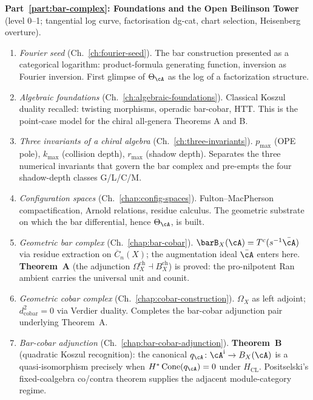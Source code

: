 \textbf{Part~\ref{part:bar-complex}: Foundations and the Open Beilinson Tower} (level 0--1; tangential log curve, factorisation dg-cat, chart selection, Heisenberg overture).
\begin{enumerate}[label=\textup{\arabic*.}]
\item \emph{Fourier seed} (Ch.~\ref{ch:fourier-seed}).
 The bar construction presented as a categorical logarithm:
 product-formula generating function, inversion as Fourier
 inversion. First glimpse of $\Theta_\cA$ as the log of a
 factorization structure.

\item \emph{Algebraic foundations}
 (Ch.~\ref{ch:algebraic-foundations}).
 Classical Koszul duality recalled: twisting morphisms, operadic
 bar-cobar, HTT. This is the point-case model for the chiral
 all-genera Theorems A and B.

\item \emph{Three invariants of a chiral algebra}
 (Ch.~\ref{ch:three-invariants}).
 $p_{\max}$ (OPE pole), $k_{\max}$ (collision depth), $r_{\max}$
 (shadow depth). Separates the three numerical invariants that
 govern the bar complex and pre-empts the four shadow-depth classes G/L/C/M.

\item \emph{Configuration spaces}
 (Ch.~\ref{chap:config-spaces}).
 Fulton--MacPherson compactification, Arnold relations, residue
 calculus. The geometric substrate on which the bar differential,
 hence $\Theta_\cA$, is built.

\item \emph{Geometric bar complex}
 (Ch.~\ref{chap:bar-cobar}).
 $\barB_X(\cA) = T^c(s^{-1}\bar\cA)$ via residue extraction on
 $\overline{C}_n(X)$; the augmentation ideal $\bar\cA$ enters here.
 \textbf{Theorem~A} (the adjunction
 $\Omega_X^{\mathrm{ch}}\dashv B_X^{\mathrm{ch}}$) is proved:
 the pro-nilpotent Ran ambient carries the universal unit and counit.

\item \emph{Geometric cobar complex}
 (Ch.~\ref{chap:cobar-construction}).
 $\Omega_X$ as left adjoint; $d^2_{\mathrm{cobar}} = 0$ via Verdier
 duality. Completes the bar-cobar adjunction pair underlying
 Theorem~A.

\item \emph{Bar-cobar adjunction}
 (Ch.~\ref{chap:bar-cobar-adjunction}).
 \textbf{Theorem~B} (quadratic Koszul recognition): the canonical
 $q_\cA\colon\cA^{\mathrm i}\to B_X(\cA)$ is a quasi-isomorphism
 precisely when $H^*\operatorname{Cone}(q_\cA)=0$ under
 $H_{\mathrm{CL}}$. Positselski's fixed-coalgebra co/contra theorem
 supplies the adjacent module-category regime.


\end{enumerate}
